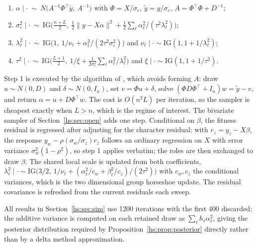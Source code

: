 \begin{enumerate}\itemsep1pt
\item $\alpha \mid \cdot \ \sim\ N\big(A^{-1}\Phi^\top \tilde y,\ A^{-1}\big)$ with $\Phi = X/\sigma_\varepsilon$, $\tilde y = y/\sigma_\varepsilon$, $A = \Phi^\top\Phi + D^{-1}$;
\item $\sigma^2_\varepsilon \mid \cdot \ \sim\ \mathrm{IG}\big(\tfrac{n+L}{2},\ \tfrac12\|y-X\alpha\|^2 + \tfrac12\sum_\ell \alpha_\ell^2/(\tau^2\lambda_\ell^2)\big)$;
\item $\lambda_\ell^2 \mid \cdot \ \sim\ \mathrm{IG}\big(1,\ 1/\nu_\ell + \alpha_\ell^2/(2\tau^2\sigma^2_\varepsilon)\big)$ and $\nu_\ell \mid \cdot \sim \mathrm{IG}(1, 1+1/\lambda_\ell^2)$;
\item $\tau^2 \mid \cdot \ \sim\ \mathrm{IG}\big(\tfrac{L+1}{2},\ 1/\xi + \tfrac{1}{2\sigma^2_\varepsilon}\sum_\ell \alpha_\ell^2/\lambda_\ell^2\big)$ and $\xi \mid \cdot \sim \mathrm{IG}(1,1+1/\tau^2)$.
\end{enumerate}

Step 1 is executed by the algorithm of \citet{hs:bhattacharya2016fast}, which avoids forming $A$: draw $u \sim N(0,D)$ and $\delta \sim N(0,I_n)$, set $v = \Phi u + \delta$, solve $(\Phi D\Phi^\top + I_n)w = \tilde y - v$, and return $\alpha = u + D\Phi^\top w$. The cost is $O(n^2L)$ per iteration, so the sampler is cheapest exactly when $L > n$, which is the regime of interest. The bivariate sampler of Section~\ref{hs:sec:open} adds one step. Conditional on $\beta$, the fitness residual is regressed after adjusting for the character residual: with $r_z = y_z - X\beta$, the response $y_w - \rho(\sigma_w/\sigma_z) r_z$ follows an ordinary regression on $X$ with error variance $\sigma_w^2(1-\rho^2)$, so step 1 applies verbatim; the roles are then exchanged to draw $\beta$. The shared local scale is updated from both coefficients, $\lambda_\ell^2 \mid \cdot \sim \mathrm{IG}\big(3/2,\ 1/\nu_\ell + (\alpha_\ell^2/c_w + \beta_\ell^2/c_z)/(2\tau^2)\big)$ with $c_w,c_z$ the conditional variances, which is the two dimensional group horseshoe update. The residual covariance is refreshed from the current residuals each sweep.

All results in Section~\ref{hs:sec:sim} use 1200 iterations with the first 400 discarded; the additive variance is computed on each retained draw as $\sum_\ell h_\ell \alpha_\ell^2$, giving the posterior distribution required by Proposition~\ref{hs:prop:posterior} directly rather than by a delta method approximation.

